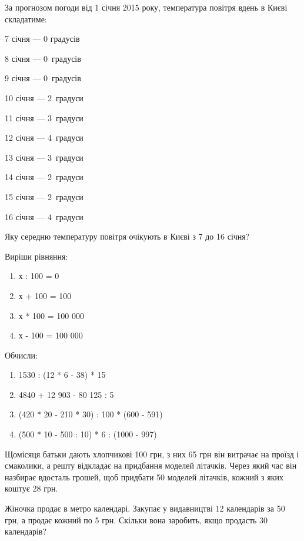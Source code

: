 \problem
За прогнозом погоди від 1 січня 2015 року, температура повітря вдень
в Києві складатиме:

\begin{multicols}{2}
    7 січня --- 0 градусів

    8 січня --- 0 градусів

    9 січня --- 0 градусів

    10 січня --- 2 градуси

    11 січня --- 3 градуси

    12 січня --- 4 градуси

    13 січня --- 3 градуси

    14 січня --- 2 градуси

    15 січня --- 2 градуси

    16 січня --- 4 градуси
\end{multicols}

Яку середню температуру повітря очікують в Києві з 7 до 16 січня?


\problem
Виріши рівняння:
\begin{multicols}{2}
    \begin{enumerate}
        \item х : 100 = 0
        \item х + 100 = 100
        \item х * 100 = 100 000
        \item х - 100 = 100 000
    \end{enumerate}
\end{multicols}


\problem
Обчисли:
\begin{enumerate}
    \item 1530 : (12 * 6 - 38) * 15
    \item 4840 + 12 903 - 80 125 : 5
    \item (420 * 20 - 210 * 30) : 100 * (600 - 591)
    \item (500 * 10 - 500 : 10) * 6 : (1000 - 997)
\end{enumerate}


\problem
Щомісяця батьки дають хлопчикові 100 грн, з них 65 грн він витрачає
на проїзд і смаколики, а решту відкладає на придбання моделей літачків.
Через який час він назбирає вдосталь грошей, щоб придбати 50 моделей літачків,
кожний з яких коштує 28 грн.


\problem
Жіночка продає в метро календарі.
Закупає у видавництві 12 календарів за 50 грн, а продає кожний по 5 грн.
Скільки вона заробить, якщо продасть 30 календарів?


